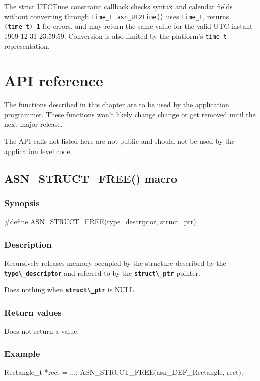 \documentclass[english,oneside,12pt]{book}
\newcommand{\apisection}[2]{\clearpage\section{\label{#1}#2}}
\newcommand{\code}[1]{\texttt{\textbf{\lstinline{#1}}}}
\begin{document}
The strict UTCTime constraint callback checks syntax and calendar fields
without converting through \texttt{time\_t}. \texttt{asn\_UT2time()} uses
\texttt{time\_t}, returns \texttt{(time\_t)-1} for errors, and may return the
same value for the valid UTC instant 1969-12-31 23:59:59. Conversion is also
limited by the platform's \texttt{time\_t} representation.


\chapter{API reference}

The functions described in this chapter are to be used by the application
programmer. These functions won't likely change change or get removed until
the next major release.

The API calls not listed here are not public and should not be used by the
application level code.

\apisection{sec:ASN_STRUCT_FREE}{ASN\_STRUCT\_FREE() macro}

\subsection*{Synopsis}

\begin{signature}
#define ASN_STRUCT_FREE(type_descriptor, struct_ptr)
\end{signature}

\subsection*{Description}

Recursively releases memory occupied by the structure
described by the \code{type\_descriptor} and referred to
by the \code{struct\_ptr} pointer.

Does nothing when \code{struct\_ptr} is NULL.

\subsection*{Return values}
Does not return a value.

\subsection*{Example}

\begin{example}
Rectangle_t *rect = ...;
ASN_STRUCT_FREE(asn_DEF_Rectangle, rect);
\end{example}
\end{document}
